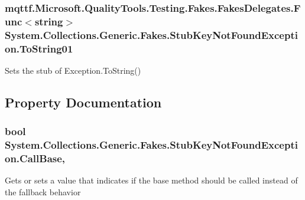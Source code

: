 \hypertarget{class_system_1_1_collections_1_1_generic_1_1_fakes_1_1_stub_key_not_found_exception_a77cedf91d38b04471883f041c50f8c7e}{
\subsubsection[{To\-String01}]{\setlength{\rightskip}{0pt plus 5cm}mqttf.\-Microsoft.\-Quality\-Tools.\-Testing.\-Fakes.\-Fakes\-Delegates.\-Func$<$string$>$ System.\-Collections.\-Generic.\-Fakes.\-Stub\-Key\-Not\-Found\-Exception.\-To\-String01}}\label{class_system_1_1_collections_1_1_generic_1_1_fakes_1_1_stub_key_not_found_exception_a77cedf91d38b04471883f041c50f8c7e}


Sets the stub of Exception.\-To\-String()



\subsection{Property Documentation}
\hypertarget{class_system_1_1_collections_1_1_generic_1_1_fakes_1_1_stub_key_not_found_exception_a4968ef9369e2a023c36e45b3f115eb1a}{
\subsubsection[{Call\-Base}]{\setlength{\rightskip}{0pt plus 5cm}bool System.\-Collections.\-Generic.\-Fakes.\-Stub\-Key\-Not\-Found\-Exception.\-Call\-Base\hspace{0.3cm}{\ttfamily [get]}, {\ttfamily [set]}}}\label{class_system_1_1_collections_1_1_generic_1_1_fakes_1_1_stub_key_not_found_exception_a4968ef9369e2a023c36e45b3f115eb1a}


Gets or sets a value that indicates if the base method should be called instead of the fallback behavior

